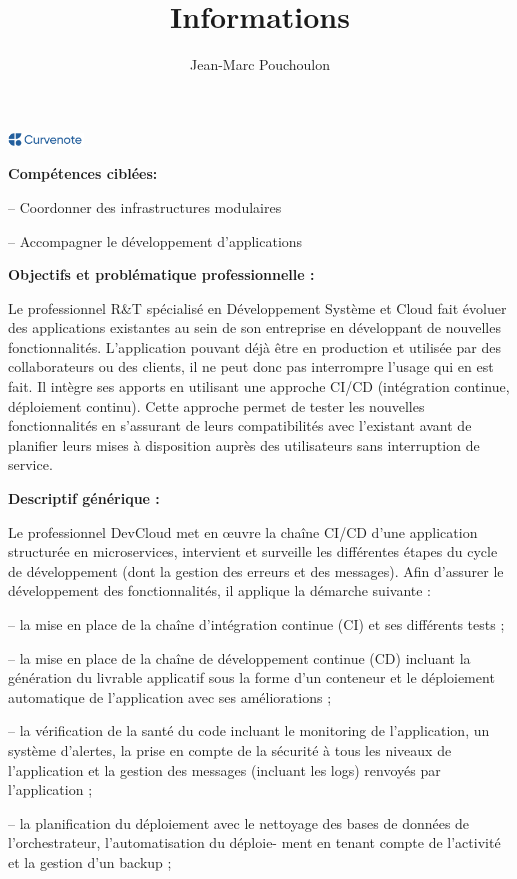 \documentclass{article}
\title{Informations}
\author{Jean-Marc Pouchoulon}
\date{\displaydate{articleDate}}
\newcommand{\logo}{
  \href{https://curvenote.com}{\includegraphics[width=2cm]{curvenote.png}}
}
\begin{document}
\maketitle
\begin{center}\logo\end{center}


\textbf{Compétences ciblées:}

-- Coordonner des infrastructures modulaires

-- Accompagner le développement d'applications

\textbf{Objectifs et problématique professionnelle :}

Le professionnel R\&T spécialisé en Développement Système et Cloud fait évoluer des applications existantes au sein de
son entreprise en développant de nouvelles fonctionnalités. L'application pouvant déjà être en production et utilisée par des
collaborateurs ou des clients, il ne peut donc pas interrompre l'usage qui en est fait. Il intègre ses apports en utilisant une
approche CI/CD (intégration continue, déploiement continu). Cette approche permet de tester les nouvelles fonctionnalités
en s'assurant de leurs compatibilités avec l'existant avant de planifier leurs mises à disposition auprès des utilisateurs sans
interruption de service.

\textbf{Descriptif générique :}

Le professionnel DevCloud met en œuvre la chaîne CI/CD d'une application structurée en microservices, intervient et surveille
les différentes étapes du cycle de développement (dont la gestion des erreurs et des messages). Afin d'assurer le développement des fonctionnalités, il applique la démarche suivante :

-- la mise en place de la chaîne d'intégration continue (CI) et ses différents tests ;

-- la mise en place de la chaîne de développement continue (CD) incluant la génération du livrable applicatif sous la forme
d'un conteneur et le déploiement automatique de l'application avec ses améliorations ;

-- la vérification de la santé du code incluant le monitoring de l'application, un système d'alertes, la prise en compte de la
sécurité à tous les niveaux de l'application et la gestion des messages (incluant les logs) renvoyés par l'application ;

-- la planification du déploiement avec le nettoyage des bases de données de l'orchestrateur, l'automatisation du déploie-
ment en tenant compte de l'activité et la gestion d'un backup ;
\end{document}
